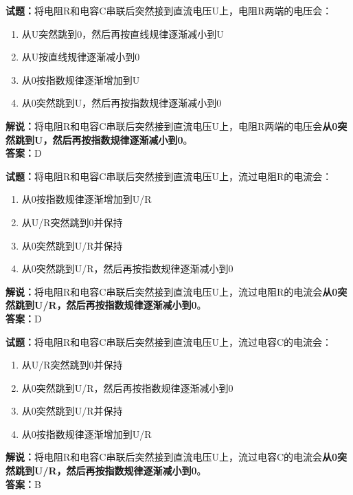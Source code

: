 \documentclass{ctexbook}
\begin{document}
\vspace{1em}

\textbf{试题：}将电阻R和电容C串联后突然接到直流电压U上，电阻R两端的电压会：
\begin{enumerate}[leftmargin=3em]
  \item 从U突然跳到0，然后再按直线规律逐渐减小到U
  \item 从U按直线规律逐渐减小到0
  \item 从0按指数规律逐渐增加到U
  \item 从0突然跳到U，然后再按指数规律逐渐减小到0
\end{enumerate}
\noindent\textbf{解说：}将电阻R和电容C串联后突然接到直流电压U上，电阻R两端的电压会\textbf{从0突然跳到U，然后再按指数规律逐渐减小到0}。\\\noindent\textbf{答案：}D

\vspace{1em}

\textbf{试题：}将电阻R和电容C串联后突然接到直流电压U上，流过电阻R的电流会：
\begin{enumerate}[leftmargin=3em]
  \item 从0按指数规律逐渐增加到U/R
  \item 从U/R突然跳到0并保持
  \item 从0突然跳到U/R并保持
  \item 从0突然跳到U/R，然后再按指数规律逐渐减小到0
\end{enumerate}
\noindent\textbf{解说：}将电阻R和电容C串联后突然接到直流电压U上，流过电阻R的电流会\textbf{从0突然跳到U/R，然后再按指数规律逐渐减小到0}。\\\noindent\textbf{答案：}D

\vspace{1em}

\textbf{试题：}将电阻R和电容C串联后突然接到直流电压U上，流过电容C的电流会：
\begin{enumerate}[leftmargin=3em]
  \item 从U/R突然跳到0并保持
  \item 从0突然跳到U/R，然后再按指数规律逐渐减小到0
  \item 从0突然跳到U/R并保持
  \item 从0按指数规律逐渐增加到U/R
\end{enumerate}
\noindent\textbf{解说：}将电阻R和电容C串联后突然接到直流电压U上，流过电容C的电流会\textbf{从0突然跳到U/R，然后再按指数规律逐渐减小到0}。\\\noindent\textbf{答案：}B

\vspace{1em}
\end{document}
